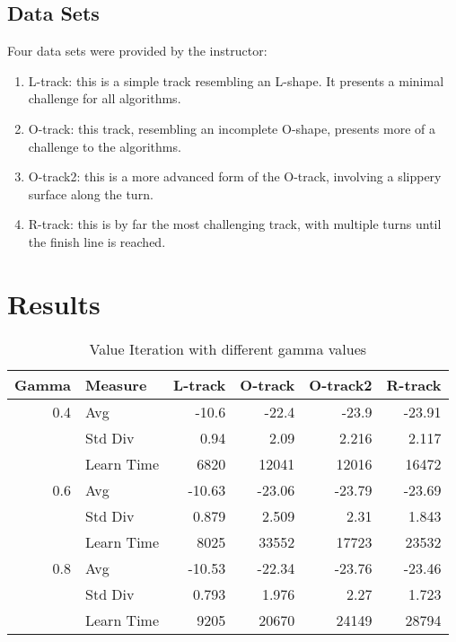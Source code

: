 \documentclass[12pt, letterpaper]{article}
\begin{document}
\subsection*{Data Sets}
Four data sets were provided by the instructor:
\begin{enumerate}
    \item L-track: this is a simple track resembling an L-shape. It presents a minimal challenge for all algorithms.
    \item O-track: this track, resembling an incomplete O-shape, presents more of a challenge to the algorithms.
    \item O-track2: this is a more advanced form of the O-track, involving a slippery surface along the turn.
    \item R-track: this is by far the most challenging track, with multiple turns until the finish line is reached.
\end{enumerate}


\section{Results}


\begin{table}[htbp]
\caption{Value Iteration with different gamma values}
\begin{center}
\begin{tabular}{|l|l|r|r|r|r|}
\hline
\textbf{Gamma} & \textbf{Measure} & \multicolumn{1}{l|}{\textbf{L-track}} & \multicolumn{1}{l|}{\textbf{O-track}} & \multicolumn{1}{l|}{\textbf{O-track2}} & \multicolumn{1}{l|}{\textbf{R-track}} \\ \hline
\multicolumn{1}{|r|}{0.4} & Avg & -10.6 & -22.4 & -23.9 & -23.91 \\ \hline
 & Std Div & 0.94 & 2.09 & 2.216 & 2.117 \\ \hline
 & Learn Time & 6820 & 12041 & 12016 & 16472 \\ \hline
\multicolumn{1}{|r|}{0.6} & Avg & -10.63 & -23.06 & -23.79 & -23.69 \\ \hline
 & Std Div & 0.879 & 2.509 & 2.31 & 1.843 \\ \hline
 & Learn Time & 8025 & 33552 & 17723 & 23532 \\ \hline
\multicolumn{1}{|r|}{0.8} & Avg & -10.53 & -22.34 & -23.76 & -23.46 \\ \hline
 & Std Div & 0.793 & 1.976 & 2.27 & 1.723 \\ \hline
 & Learn Time & 9205 & 20670 & 24149 & 28794 \\ \hline
\end{tabular}
\end{center}
\label{vi_gamma}
\end{table}
\end{document}
